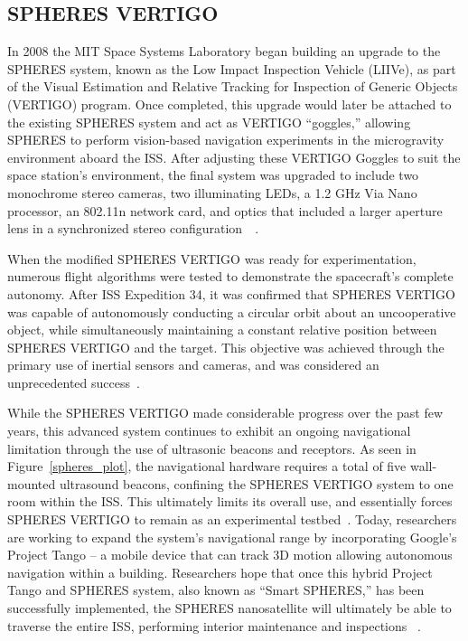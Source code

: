 \documentclass[journal, 10pt]{IEEEtran}
\begin{document}
\subsection{SPHERES VERTIGO}
In 2008 the MIT Space Systems Laboratory began building an upgrade to the SPHERES system, known as the Low Impact Inspection Vehicle (LIIVe), as part of the Visual Estimation and Relative Tracking for Inspection of Generic Objects (VERTIGO) program. Once completed, this upgrade would later be attached to the existing SPHERES system and act as VERTIGO ``goggles,'' allowing SPHERES to perform vision-based navigation experiments in the microgravity environment aboard the ISS. After adjusting these VERTIGO Goggles to suit the space station's environment, the final system was upgraded to include two monochrome stereo cameras, two illuminating LEDs, a 1.2 GHz Via Nano processor, an 802.11n network card, and optics that included a larger aperture lens in a synchronized stereo configuration~~\cite{SPHERES, Vertigo 1, Vertigo2, Vertigo3}.

When the modified SPHERES VERTIGO was ready for experimentation, numerous flight algorithms were tested to demonstrate the spacecraft's complete autonomy. After ISS Expedition 34, it was confirmed that SPHERES VERTIGO was capable of autonomously conducting a circular orbit about an uncooperative object, while simultaneously maintaining a constant relative position between SPHERES VERTIGO and the target. This objective was achieved through the primary use of inertial sensors and cameras, and was considered an unprecedented success~\cite{Vertigo2, Vertigo3}.

While the SPHERES VERTIGO made considerable progress over the past few years, this advanced system continues to exhibit an ongoing navigational limitation through the use of ultrasonic beacons and receptors.  As seen in Figure~\ref{spheres_plot}, the navigational hardware requires a total of five wall-mounted ultrasound beacons, confining the SPHERES VERTIGO system to one room within the ISS. This ultimately  limits its overall use, and essentially forces SPHERES VERTIGO to remain as an experimental testbed~\cite{SPHERES, Vertigo 1, Vertigo2, Vertigo3}. Today, researchers are working to expand the system's navigational range by incorporating Google's Project Tango -- a mobile device that can track 3D motion allowing autonomous navigation within a building. Researchers hope that once this hybrid Project Tango and SPHERES system, also known as ``Smart SPHERES,'' has been successfully implemented, the SPHERES nanosatellite will ultimately be able to traverse the entire ISS, performing interior maintenance and inspections ~\cite{Tango}.
\end{document}
